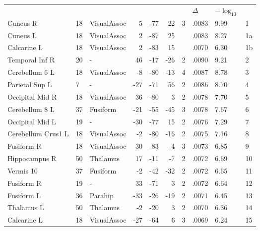\begin{table}
    \small
    \centering
    \begin{ThreePartTable}
    \begin{tabularx}{\textwidth}{l l p{1.5cm} *{3}{r} *{2}{P{.8cm}} P{1.3cm} P{.5cm}}

     \\
    \toprule
     &  &  &  &  &  &  & \(\Delta\)  & \(-\log_{10}\) &  \\
    \toprule
Cuneus R & 18 & VisualAssoc & 5 & -77 & 22 & 3 & .0083 & 9.99 & 1 \\
Cuneus L & 18 & VisualAssoc & 2 & -87 & 25 &  &  .0083 & 8.27 & 1a\tnote{*} \\
Calcarine L & 18 & VisualAssoc & 2 & -83 & 15 &  &  .0070 & 6.30 & 1b \\
Temporal Inf R & 20 & - & 46 & -17 & -26 & 2 &  .0090 & 9.21 & 2 \\
Cerebellum 6 L & 18 & VisualAssoc & -8 & -80 & -13 & 4 &  .0087 & 8.78 & 3 \\
Parietal Sup L & 7 & - & -27 & -71 & 56 & 2 &  .0086 & 8.70 & 4 \\
Occipital Mid R & 18 & VisualAssoc & 36 & -80 & 3 & 2 &  .0078 & 7.70  & 5 \\
Cerebellum 8 L & 37 & Fusiform & -21 & -55 & -45 & 3 &  .0078  & 7.67 & 6 \\
Occipital Mid L & 19 & - & -30 & -77 & 15 & 2 &  .0076 & 7.29  & 7 \\
Cerebellum Crus1 L & 18 & VisualAssoc & -2 & -80 & -16 & 2 &  .0075 & 7.16  & 8 \\
Fusiform R & 18 & VisualAssoc & 30 & -83 & -4 & 3 &  .0073  & 6.85  & 9 \\
Hippocampus R & 50 & Thalamus & 17 & -11 & -7 & 2 &  .0072 & 6.69 & 10 \\
Vermis 10 & 37 & Fusiform & -2 & -42 & -32 & 2 &  .0072 & 6.65 & 11 \\
Fusiform R & 19 & - & 33 & -71 & 3 & 2 &  .0072 & 6.64  & 12 \\
Fusiform L & 36 & Parahip & -33 & -26 & -19 & 2 &  .0071 & 6.45  & 13 \\
Thalamus L & 50 & Thalamus & -2 & -20 & 3 & 2 &  .0070  & 6.36 & 14 \\
Calcarine L & 18 & VisualAssoc & -27 & -64 & 6 & 3 &  .0069  & 6.24  & 15 \\

\end{tabularx}
\end{ThreePartTable}
\end{table}
